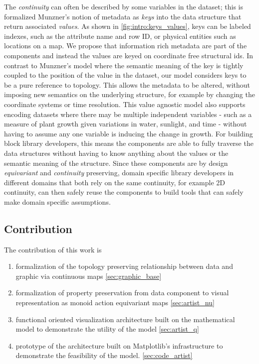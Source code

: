 \documentclass[../main.tex]{subfiles}
\begin{document}
The \textit{continuity} can often be described by some variables in the dataset; this is formalized Munzner's notion of metadata as \textit{keys} into the data structure that return associated \textit{values}\cite{munznerChDataAbstraction}. As shown in \autoref{fig:intro:keys_values}, keys can be labeled indexes, such as the attribute name and row ID, or physical entities such as locations on a map. We propose that information rich metadata are part of the components and instead the values are keyed on coordinate free structural ids. In contrast to Munzner's model where the semantic meaning of the key is tightly coupled to the position of the value in the dataset, our model considers keys to be a pure reference to topology. This allows the metadata to be altered, without imposing new semantics on the underlying structure, for example by changing the coordinate systems or time resolution. This value agnostic model also supports encoding datasets where there may be multiple independent variables - such as a measure of plant growth given variations in water, sunlight, and time - without having to assume any one variable is inducing the change in growth. For building block library developers, this means the components are able to fully traverse the data structures without having to know anything about the values or the semantic meaning of the structure. Since these components are by design \textit{equivariant} and \textit{continuity} preserving, domain specific library developers in different domains that both rely on the same continuity, for example 2D continuity, can then safely reuse the components to build tools that can safely make domain specific assumptions.

\subsection{Contribution}
The contribution of this work is 
\begin{enumerate}
  \item formalization of the topology preserving relationship between data and graphic via continuous maps \autoref{sec:graphic_base}
  \item formalization of property preservation from data component to visual representation as monoid action equivariant maps \autoref{sec:artist_nu}
  \item functional oriented visualization architecture built on the mathematical model to demonstrate the utility of the model \autoref{sec:artist_q}
  \item prototype of the architecture built on Matplotlib's infrastructure to demonstrate the feasibility of the model. \autoref{sec:code_artist}
\end{enumerate}
\end{document}
